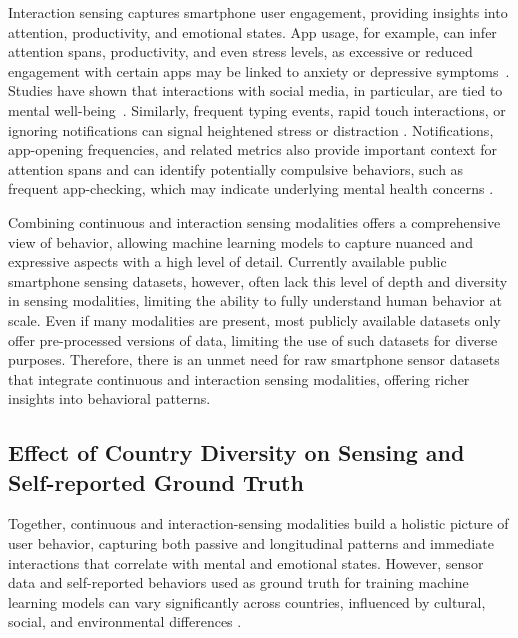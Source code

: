 Interaction sensing captures smartphone user engagement, providing insights into attention, productivity, and emotional states. App usage, for example, can infer attention spans, productivity, and even stress levels, as excessive or reduced engagement with certain apps may be linked to anxiety or depressive symptoms~\cite{guracho2023smartphone}. Studies have shown that interactions with social media, in particular, are tied to mental well-being~\cite{buda2021outliers}. Similarly, frequent typing events, rapid touch interactions, or ignoring notifications can signal heightened stress or distraction \cite{vahedi2018association}. Notifications, app-opening frequencies, and related metrics also provide important context for attention spans and can identify potentially compulsive behaviors, such as frequent app-checking, which may indicate underlying mental health concerns \cite{meegahapola2020smartphone, carlo2019numbers}.

Combining continuous and interaction sensing modalities offers a comprehensive view of behavior, allowing machine learning models to capture nuanced and expressive aspects with a high level of detail. Currently available public smartphone sensing datasets, however, often lack this level of depth and diversity in sensing modalities, limiting the ability to fully understand human behavior at scale. Even if many modalities are present, most publicly available datasets only offer pre-processed versions of data, limiting the use of such datasets for diverse purposes. Therefore, there is an unmet need for raw smartphone sensor datasets that integrate continuous and interaction sensing modalities, offering richer insights into behavioral patterns. 

\subsection{Effect of Country Diversity on Sensing and Self-reported Ground Truth}

Together, continuous and interaction-sensing modalities build a holistic picture of user behavior, capturing both passive and longitudinal patterns and immediate interactions that correlate with mental and emotional states. However, sensor data and self-reported behaviors used as ground truth for training machine learning models can vary significantly across countries, influenced by cultural, social, and environmental differences \cite{phan2022mobile}.

